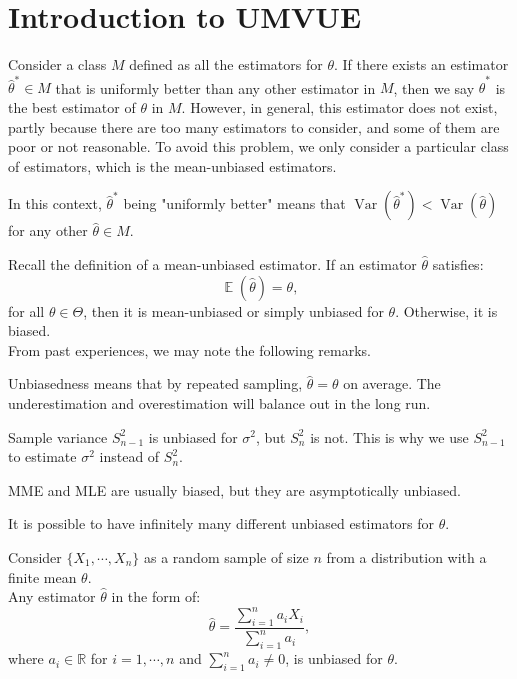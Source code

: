 \documentclass{huhtakm-template-book-v2}
\DeclareMathOperator{\E}{\mathbb{E}}
\DeclareMathOperator{\Var}{Var}
\begin{document}
\section{Introduction to UMVUE}
    Consider a class $M$ defined as all the estimators for $\theta$. If there exists an estimator $\hat{\theta}^{*} \in M$ that is uniformly better than any other estimator in $M$, then we say $\hat{\theta}^{*}$ is the best estimator of $\theta$ in $M$. However, in general, this estimator does not exist, partly because there are too many estimators to consider, and some of them are poor or not reasonable. To avoid this problem, we only consider a particular class of estimators, which is the mean-unbiased estimators.
    \begin{rem}
        In this context, $\hat{\theta}^{*}$ being "uniformly better" means that $\Var(\hat{\theta}^{*}) < \Var(\hat{\theta})$ for any other $\hat{\theta} \in M$.
    \end{rem}
    Recall the definition of a mean-unbiased estimator. If an estimator $\hat{\theta}$ satisfies:
    \begin{equation*}
        \E(\hat{\theta}) = \theta,
    \end{equation*}
    for all $\theta \in \Theta$, then it is mean-unbiased or simply unbiased for $\theta$. Otherwise, it is biased.\\
    From past experiences, we may note the following remarks.
    \begin{rem}
        Unbiasedness means that by repeated sampling, $\hat{\theta} = \theta$ on average. The underestimation and overestimation will balance out in the long run.
    \end{rem}
    \begin{rem}
        Sample variance $S_{n-1}^{2}$ is unbiased for $\sigma^{2}$, but $S_{n}^{2}$ is not. This is why we use $S_{n-1}^{2}$ to estimate $\sigma^{2}$ instead of $S_{n}^{2}$.
    \end{rem}
    \begin{rem}
        MME and MLE are usually biased, but they are asymptotically unbiased.
    \end{rem}
    \begin{rem}
        It is possible to have infinitely many different unbiased estimators for $\theta$.
    \end{rem}
    \begin{eg}
        Consider $\{X_{1}, \cdots, X_{n}\}$ as a random sample of size $n$ from a distribution with a finite mean $\theta$.\\
        Any estimator $\hat{\theta}$ in the form of:
        \begin{equation*}
            \hat{\theta} = \frac{\sum_{i=1}^{n} a_{i} X_{i}}{\sum_{i=1}^{n} a_{i}},
        \end{equation*}
        where $a_{i} \in \mathbb{R}$ for $i = 1, \cdots, n$ and $\sum_{i=1}^{n} a_{i} \neq 0$, is unbiased for $\theta$.
    \end{eg}
\end{document}
